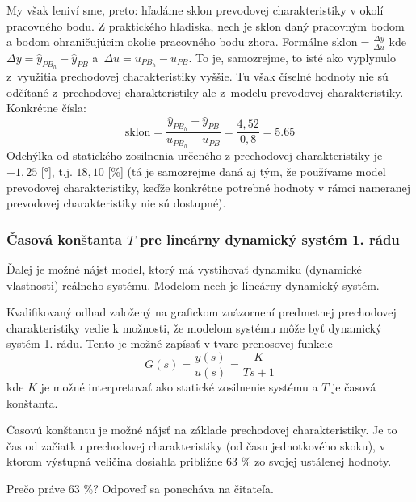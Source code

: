 \documentclass[a4paper, 10pt, ]{article}
\begin{document}
My však leniví sme, preto: hľadáme sklon prevodovej charakteristiky v okolí pracovného bodu. Z praktického hľadiska, nech je sklon daný pracovným bodom a bodom ohraničujúcim okolie pracovného bodu zhora. Formálne $\text{sklon} = \frac{\Delta y}{\Delta u}$ kde $\Delta y = \hat y_{PB_h} - \hat y_{PB}$ a~$\Delta u = u_{PB_h} - u_{PB}$. To je, samozrejme, to isté ako vyplynulo z~využitia prechodovej charakteristiky vyššie. Tu však číselné hodnoty nie sú odčítané z~prechodovej charakteristiky ale z~modelu prevodovej charakteristiky. Konkrétne čísla:
\begin{equation}
    \text{sklon} = \frac{\hat y_{PB_h} - \hat y_{PB}}{u_{PB_h} - u_{PB}} = \frac{4,52}{0,8} = 5.65
\end{equation}
Odchýlka od statického zosilnenia určeného z prechodovej charakteristiky je $-1,25$ [°], t.j. $18,10$ [\%] (tá je samozrejme daná aj tým, že používame model prevodovej charakteristiky, keďže konkrétne potrebné hodnoty v rámci nameranej prevodovej charakteristiky nie sú dostupné).




\subsubsection[Časová konštanta $T$ pre lineárny dynamický systém 1. rádu]{Časová konštanta $T$ pre lineárny dynamický systém 1. rádu}


Ďalej je možné nájsť model, ktorý má vystihovať dynamiku (dynamické vlastnosti) reálneho systému. Modelom nech je lineárny dynamický systém.

Kvalifikovaný odhad založený na grafickom znázornení predmetnej prechodovej charakteristiky vedie k možnosti, že modelom systému môže byť dynamický systém 1. rádu. Tento je možné zapísať v tvare prenosovej funkcie
\begin{equation}
    G(s) = \frac{y(s)}{u(s)} = \frac{K}{Ts+1}
\end{equation}
kde $K$ je možné interpretovať ako statické zosilnenie systému a $T$ je časová konštanta.

Časovú konštantu je možné nájsť na základe prechodovej charakteristiky. Je to čas od začiatku prechodovej charakteristiky (od času jednotkového skoku), v ktorom výstupná veličina dosiahla približne 63 \% zo svojej ustálenej hodnoty.

Prečo práve 63 \%? Odpoveď sa ponecháva na čitateľa.
\end{document}
